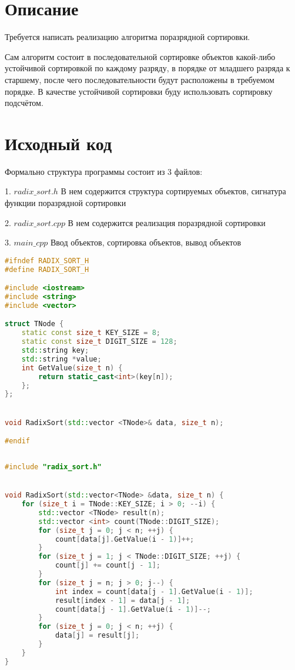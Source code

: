 \section{Описание}
Требуется написать реализацию алгоритма поразрядной сортировки.

Сам алгоритм состоит в последовательной сортировке объектов какой-либо устойчивой сортировкой по каждому разряду,
в порядке от младшего разряда к старшему, после чего последовательности будут расположены в требуемом порядке.
В качестве устойчивой сортировки буду использовать сортировку подсчётом.

\pagebreak

\section{Исходный код}
Формально структура программы состоит из 3 файлов:

1. $radix\_sort.h$ В нем содержится структура сортируемых объектов, сигнатура функции поразрядной сортировки

2. $radix\_sort.cpp$ В нем содержится реализация поразрядной сортировки

3. $main\_cpp$ Ввод объектов, сортировка объектов, вывод объектов
 
\begin{lstlisting}[language=C++]
#ifndef RADIX_SORT_H
#define RADIX_SORT_H

#include <iostream>
#include <string>
#include <vector>

struct TNode {
	static const size_t KEY_SIZE = 8;
	static const size_t DIGIT_SIZE = 128;
	std::string key;
	std::string *value;
	int GetValue(size_t n) {
		return static_cast<int>(key[n]);
	};
};


void RadixSort(std::vector <TNode>& data, size_t n);

#endif
	
\end{lstlisting}

\begin{lstlisting}[language=C++]
#include "radix_sort.h"


void RadixSort(std::vector<TNode> &data, size_t n) {
	for (size_t i = TNode::KEY_SIZE; i > 0; --i) {
		std::vector <TNode> result(n);
		std::vector <int> count(TNode::DIGIT_SIZE);
		for (size_t j = 0; j < n; ++j) {
			count[data[j].GetValue(i - 1)]++;
		}
		for (size_t j = 1; j < TNode::DIGIT_SIZE; ++j) {
			count[j] += count[j - 1];
		}
		for (size_t j = n; j > 0; j--) {
			int index = count[data[j - 1].GetValue(i - 1)];
			result[index - 1] = data[j - 1];
			count[data[j - 1].GetValue(i - 1)]--;
		}
		for (size_t j = 0; j < n; ++j) {
			data[j] = result[j];
		}
	}
}
\end{lstlisting}


